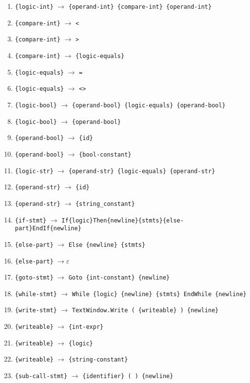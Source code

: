 \documentclass[a4paper,12pt,notitlepage,pdftex]{scrreprt}
\begin{document}
\begin{enumerate}
                \item \verb'{logic-int}' $\rightarrow$ \verb'{operand-int} {compare-int} {operand-int}'
                \item \verb'{compare-int}' $\rightarrow$ \verb'<'
                \item \verb'{compare-int}' $\rightarrow$ \verb'>'
                \item \verb'{compare-int}' $\rightarrow$ \verb'{logic-equals}'
                \item \verb'{logic-equals}' $\rightarrow$ \verb'='
                \item \verb'{logic-equals}' $\rightarrow$ \verb'<>'
                \item \verb'{logic-bool}' $\rightarrow$ \verb'{operand-bool} {logic-equals} {operand-bool}'
                \item \verb'{logic-bool}' $\rightarrow$ \verb'{operand-bool}'
                \item \verb'{operand-bool}' $\rightarrow$ \verb'{id}'
                \item \verb'{operand-bool}' $\rightarrow$ \verb'{bool-constant}'
                \item \verb'{logic-str}' $\rightarrow$ \verb'{operand-str} {logic-equals} {operand-str}'
                \item \verb'{operand-str}' $\rightarrow$ \verb'{id}'
                \item \verb'{operand-str}' $\rightarrow$ \verb'{string_constant}'
                \item \verb'{if-stmt}' $\rightarrow$ \verb'If{logic}Then{newline}{stmts}{else-part}EndIf{newline}'
                \item \verb'{else-part}' $\rightarrow$ \verb'Else {newline} {stmts}'
                \item \verb'{else-part}' $\rightarrow \varepsilon$
                \item \verb'{goto-stmt}' $\rightarrow$ \verb'Goto {int-constant} {newline}'
                \item \verb'{while-stmt}' $\rightarrow$ \verb'While {logic} {newline} {stmts} EndWhile {newline}'
                \item \verb'{write-stmt}' $\rightarrow$ \verb'TextWindow.Write ( {writeable} ) {newline}'
                \item \verb'{writeable}' $\rightarrow$ \verb'{int-expr}'
                \item \verb'{writeable}' $\rightarrow$ \verb'{logic}'
                \item \verb'{writeable}' $\rightarrow$ \verb'{string-constant}'
                \item \verb'{sub-call-stmt}' $\rightarrow$ \verb'{identifier} ( ) {newline}'
            \end{enumerate}
\end{document}
